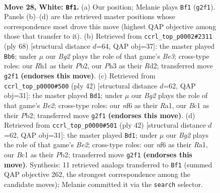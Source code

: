 \documentclass[11pt]{article}
\begin{document}
\clearpage

\begin{figure}[p]\centering
\begin{subfigure}{0.46\textwidth}\centering
\resizebox{\linewidth}{!}{%
\newchessgame
\chessboard[
  setfen={r3k1r1/5p2/b4n2/8/p2pp2p/7P/PP3PB1/1RBK3R w q - 2 28},
  showmover=false,
  pgfstyle=straightmove, color=movearrow, markmove={g2-f1}
]}
\caption{}
\end{subfigure}\hfill
\begin{subfigure}{0.46\textwidth}\centering
\resizebox{\linewidth}{!}{%
\newchessgame
\chessboard[
  setfen={r2r2k1/7n/2Rp3b/1p1P1Pp1/4p1Pp/4B2P/1P1R4/3B2K1 w - - 5 35},
  showmover=false,
  pgfstyle=straightmove, color=movearrow, markmove={e3-b6}
]}
\caption{}
\end{subfigure}
\\[4pt]
\begin{subfigure}{0.46\textwidth}\centering
\resizebox{\linewidth}{!}{%
\newchessgame
\chessboard[
  setfen={r1b1k2r/5p2/1p2p3/6Pp/3nP3/7P/PP2B3/R1B1K2R w KQkq - 0 22},
  showmover=false,
  pgfstyle=straightmove, color=movearrow, markmove={e2-d1}
]}
\caption{}
\end{subfigure}\hfill
\begin{subfigure}{0.46\textwidth}\centering
\resizebox{\linewidth}{!}{%
\newchessgame
\chessboard[
  setfen={r1b1k2r/5p2/1p2p3/6Pp/3nP3/7P/PP2B3/R1B1K2R w KQkq - 0 22},
  showmover=false,
  pgfstyle=straightmove, color=movearrow, markmove={e2-d1}
]}
\caption{}
\end{subfigure}
\caption{\textbf{Move 28, White: \texttt{Bf1}.} (a) Our position; Melanie plays \texttt{Bf1} (\texttt{g2f1}). Panels (b)--(d) are the retrieved master positions whose correspondence most drove this move (highest QAP objective among those that transfer to it). (b) Retrieved from \texttt{ccrl\_top\_p0002\#2311} (ply 68) [structural distance $d$=64, QAP obj=37]: the master played \texttt{Bb6}; under $\mu$ our \emph{Bg2} plays the role of that game's \emph{Be3}; cross-type roles: our \emph{R}h1 as their \emph{P}b2, our \emph{P}h3 as their \emph{R}d2; transferred move \texttt{g2f1} \textbf{(endorses this move)}. (c) Retrieved from \texttt{ccrl\_top\_p0000\#500} (ply 42) [structural distance $d$=62, QAP obj=31]: the master played \texttt{Bd1}; under $\mu$ our \emph{Bg2} plays the role of that game's \emph{Be2}; cross-type roles: our \emph{n}f6 as their \emph{R}a1, our \emph{B}c1 as their \emph{P}b2; transferred move \texttt{g2f1} \textbf{(endorses this move)}. (d) Retrieved from \texttt{ccrl\_top\_p0000\#501} (ply 42) [structural distance $d$=62, QAP obj=31]: the master played \texttt{Bd1}; under $\mu$ our \emph{Bg2} plays the role of that game's \emph{Be2}; cross-type roles: our \emph{n}f6 as their \emph{R}a1, our \emph{B}c1 as their \emph{P}b2; transferred move \texttt{g2f1} \textbf{(endorses this move)}. Synthesis: 11 retrieved analogs transferred to \texttt{Bf1} (summed QAP objective 262, the strongest correspondence among the candidate moves); Melanie committed it via the \texttt{search} selector.}
\label{fig:thought-m54}
\end{figure}
\end{document}
